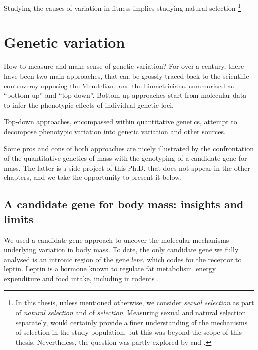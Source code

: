 Studying the causes of variation in fitness implies studying natural selection \footnote{In this thesis, unless mentioned otherwise, we consider \emph{sexual selection} as part of \emph{natural selection} and of \emph{selection}. Measuring sexual and natural selection separately, would certainly provide a finer understanding of the mechanisms of selection in the study population, but this was beyond the scope of this thesis. Nevertheless, the question was partly explored by \cite{Garcia-Navas2016} and \cite{Garcia-Navas2015a}.}

\section{Genetic variation}

How to measure and make sense of genetic variation?
For over a century, there have been two main approaches, that can be grossly traced back to the scientific controversy opposing the Mendelians and the biometricians.
summarized as ``bottom-up'' and ``top-down''.
Bottom-up approaches start from molecular data to infer the phenotypic effects of individual genetic loci. 


Top-down approaches, encompassed within quantitative genetics, attempt to decompose phenotypic variation into genetic variation and other sources. 


Some pros and cons of both approaches are nicely illustrated by the confrontation of the quantitative genetics of mass with the genotyping of a candidate gene for mass. The latter is a side project of this Ph.D. that does not appear in the other chapters, and we take the opportunity to present it below.

\subsection{A candidate gene for body mass: insights and limits}

We used a candidate gene approach \parencite{Fitzpatrick2005} to uncover the molecular mechanisms underlying variation in body mass. To date, the only candidate gene we fully analysed is an intronic region of the gene \emph{lepr}, which codes for the receptor to leptin. Leptin is a hormone known to regulate fat metabolism, energy expenditure and food intake, including in rodents \parencite{Houseknecht1998}.


